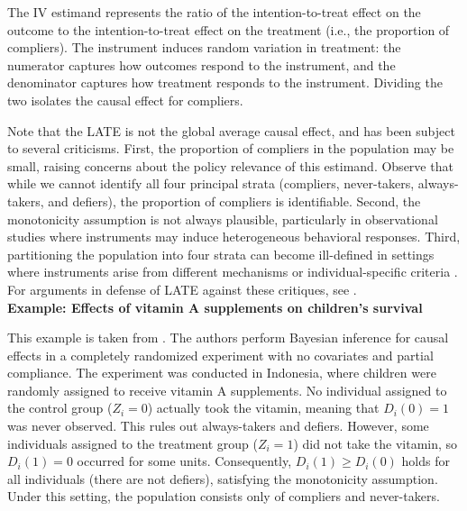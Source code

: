 The IV estimand represents the ratio of the intention-to-treat effect on the outcome to the intention-to-treat effect on the treatment (i.e., the proportion of compliers). The instrument induces random variation in treatment: the numerator captures how outcomes respond to the instrument, and the denominator captures how treatment responds to the instrument. Dividing the two isolates the causal effect for compliers.

Note that the LATE is not the global average causal effect, and has been subject to several criticisms. First, the proportion of compliers in the population may be small, raising concerns about the policy relevance of this estimand. Observe that while we cannot identify all four principal strata (compliers, never-takers, always-takers, and defiers), the proportion of compliers is identifiable. Second, the monotonicity assumption is not always plausible, particularly in observational studies where instruments may induce heterogeneous behavioral responses. Third, partitioning the population into four strata can become ill-defined in settings where instruments arise from different mechanisms or individual-specific criteria \cite{deaton2010instruments,hernan2020causal}. For arguments in defense of LATE against these critiques, see \cite{angrist2010better}.\\

\textbf{Example: Effects of vitamin A supplements on children's survival}

This example is taken from \cite{imbens1997bayesian}. The authors perform Bayesian inference for causal effects in a completely randomized experiment with no covariates and partial compliance. The experiment was conducted in Indonesia, where children were randomly assigned to receive vitamin A supplements. No individual assigned to the control group ($Z_i = 0$) actually took the vitamin, meaning that $D_i(0) = 1$ was never observed. This rules out always-takers and defiers. However, some individuals assigned to the treatment group ($Z_i = 1$) did not take the vitamin, so $D_i(1) = 0$ occurred for some units. Consequently, $D_i(1) \geq D_i(0)$ holds for all individuals (there are not defiers), satisfying the monotonicity assumption. Under this setting, the population consists only of compliers and never-takers.

